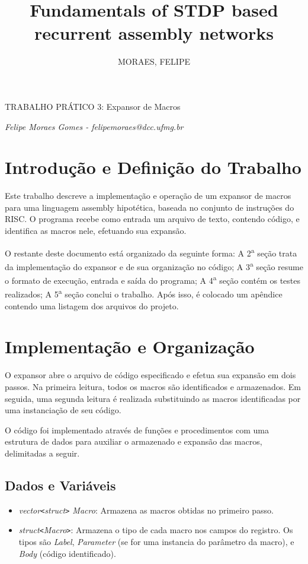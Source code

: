 \documentclass[12pt, a4paper]{article}
\author{MORAES, FELIPE}
\title{Fundamentals of STDP based recurrent assembly networks}
\begin{document}
\begin{center}
{\huge TRABALHO PRÁTICO 3: Expansor de Macros}

\textit{Felipe Moraes Gomes - felipemoraes@dcc.ufmg.br}
\end{center}

\section{Introdução e Definição do Trabalho}
Este trabalho descreve a implementação e operação de um expansor de macros para uma linguagem assembly hipotética, baseada no conjunto de instruções do RISC. O programa recebe como entrada um arquivo de texto, contendo código, e identifica as macros nele, efetuando sua expansão.

O restante deste documento está organizado da seguinte forma: A 2\textsuperscript{a} seção trata da implementação do expansor e de sua organização no código; A 3\textsuperscript{a} seção resume o formato de execução, entrada e saída do programa; A 4\textsuperscript{a} seção contém os testes realizados; A 5\textsuperscript{a} seção conclui o trabalho. Após isso, é colocado um apêndice contendo uma listagem dos arquivos do projeto. 

\section{Implementação e Organização}

O expansor abre o arquivo de código especificado e efetua sua expansão em dois passos. Na primeira leitura, todos os macros são identificados e armazenados. Em seguida, uma segunda leitura é realizada substituindo as macros identificadas por uma instanciação de seu código.

O código foi implementado através de funções e procedimentos com uma estrutura de dados para auxiliar o armazenado e expansão das macros, delimitadas a seguir.

\subsection{Dados e Variáveis}


\begin{itemize}
	\item \emph{vector{\tt<}struct{\tt>} Macro}: Armazena as macros obtidas no primeiro passo.	
	\item \emph{struct{\tt<}Macro{\tt>}}: Armazena o tipo de cada macro nos campos do registro. Os tipos são \emph{Label}, \emph{Parameter} (se for uma instancia do parâmetro da macro), e \emph{Body} (código identificado).
\end{itemize}
\end{document}
